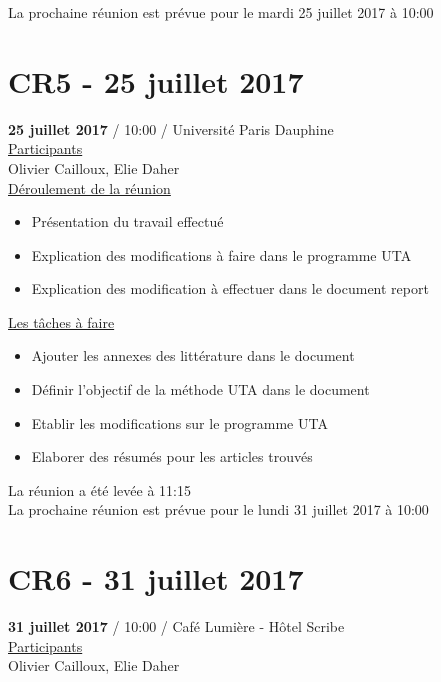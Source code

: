 \documentclass{report}
\begin{document}
\begin{appendices}
La prochaine réunion est prévue pour le mardi 25 juillet 2017 à 10:00

\newpage
\section{CR5 - 25 juillet 2017}
\textbf{25 juillet 2017} / 10:00 / Université Paris Dauphine \\

\underline{Participants} \\

Olivier Cailloux, Elie Daher\\

\underline{Déroulement de la réunion}\\
\begin{itemize}
	\item Présentation du travail effectué
	\item Explication des modifications à faire dans le programme UTA
	\item Explication des modification à effectuer dans le document report\\
\end{itemize}

\underline{Les tâches à faire} \\
\begin{itemize}
	\item Ajouter les annexes des littérature dans le document
	\item Définir l’objectif de la méthode UTA dans le document
	\item Etablir les modifications sur le programme UTA
	\item Elaborer des résumés pour les articles trouvés\\
\end{itemize}

La réunion a été levée à 11:15\\

La prochaine réunion est prévue pour le lundi 31 juillet 2017 à 10:00

\newpage
\section{CR6 - 31 juillet 2017}
\textbf{31 juillet 2017} / 10:00 / Café Lumière - Hôtel Scribe\\

\underline{Participants} \\

Olivier Cailloux, Elie Daher\\


\end{appendices}
\end{document}
